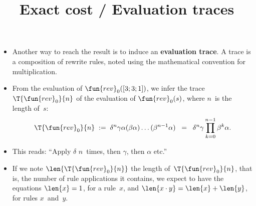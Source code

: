 \documentclass[wide]{slides}
\begin{document}
\begin{slide}
  \title{Exact cost / Evaluation traces}

  \begin{itemize}

    \item Another way to reach the result is to induce an
      \textbf{evaluation trace}. A trace is a composition of rewrite
      rules, noted using the mathematical convention for
      multiplication.

    \item From the evaluation of \(\fun{rev}_0([3;3;1])\), we infer
      the trace \(\T{\fun{rev}_0}{n}\) of the evaluation of
      \(\fun{rev}_0(s)\), where \(n\)~is the length of~\(s\):
      \begin{equation*}
        \T{\fun{rev}_0}{n} \;\; \text{:=} \;\;
        \delta^n\gamma\alpha(\beta\alpha)\dots(\beta^{n-1}\alpha) \;\;
        = \;\; \delta^n\gamma \prod_{k=0}^{n-1}{\beta^k\alpha}.
      \end{equation*}

    \item This reads: ``Apply \(\delta\) \(n\)~times, then \(\gamma\),
      then \(\alpha\) etc.''

    \item If we note \(\len{\T{\fun{rev}_0}{n}}\) the length
      of~\(\T{\fun{rev}_0}{n}\), that is, the number of rule
      applications it contains, we expect to have the equations
      \(\len{x} = 1\), for a rule~\(x\), and \(\len{x \cdot y} =
      \len{x} + \len{y}\), for rules \(x\)~and~\(y\).

  \end{itemize}

\end{slide}
\end{document}
